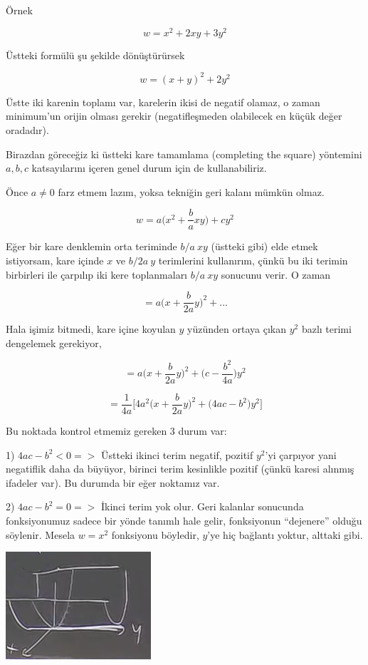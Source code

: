 \documentclass[12pt,fleqn]{article}\usepackage{../../common}
\begin{document}
Örnek

$$ w = x^2 + 2xy + 3y^2 $$

Üstteki formülü şu şekilde dönüştürürsek

$$ w = (x+y)^2 + 2y^2 $$

Üstte iki karenin toplamı var, karelerin ikisi de negatif olamaz, o zaman
minimum'un orijin olması gerekir (negatifleşmeden olabilecek en küçük değer
oradadır). 

Birazdan göreceğiz ki üstteki kare tamamlama (completing the square)
yöntemini $a,b,c$ katsayılarını içeren genel durum için de kullanabiliriz. 

Önce $a \ne 0$ farz etmem lazım, yoksa tekniğin geri kalanı mümkün olmaz. 

$$ w = a \bigg( x^2 + \frac{b}{a} xy \bigg) + cy^2 $$

Eğer bir kare denklemin orta teriminde $b/a \ xy$ (üstteki gibi) elde etmek
istiyorsam, kare içinde $x$ ve $b/2a \ y$ terimlerini kullanırım, çünkü bu iki
terimin birbirleri ile çarpılıp iki kere toplanmaları $b/a \ xy$ sonucunu
verir. O zaman

$$ = a \bigg( x + \frac{b}{2a}y  \bigg)^2  + ... $$

Hala işimiz bitmedi, kare içine koyulan $y$ yüzünden ortaya çıkan $y^2$ bazlı
terimi dengelemek gerekiyor,

$$ = a \bigg( x + \frac{b}{2a}y  \bigg)^2  + 
\bigg( c - \frac{b^2}{4a} \bigg)y^2
$$


$$ = \frac{1}{4a} 
\bigg[
4a^2 \bigg( x+\frac{b}{2a}y \bigg)^2 +
\bigg(4ac - b^2 \bigg)y^2
\bigg]
$$

Bu noktada kontrol etmemiz gereken 3 durum var:

1) $4ac - b^2 < 0 => $ Üstteki ikinci terim negatif, pozitif $y^2$'yi
çarpıyor yani negatiflik daha da büyüyor, birinci terim kesinlikle pozitif
(çünkü karesi alınmış ifadeler var). Bu durumda bir eğer noktamız var. 


2)  $4ac - b^2 = 0 => $ İkinci terim yok olur. Geri kalanlar sonucunda
fonksiyonumuz sadece bir yönde tanımlı hale gelir, fonksiyonun ``dejenere''
olduğu söylenir. Mesela $w = x^2$ fonksiyonu böyledir, $y$'ye hiç bağlantı
yoktur, alttaki gibi.

\begin{center}
\includegraphics[height=4cm]{10_2.png}
\end{center}
\end{document}
